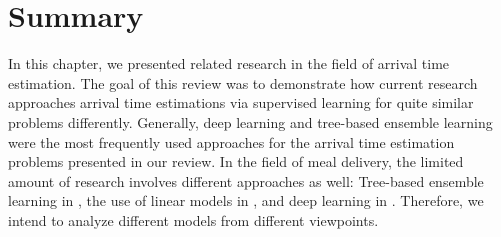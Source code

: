\section{Summary}

In this chapter, we presented related research in the field of arrival time estimation. The goal of this review was to demonstrate how current research approaches arrival time estimations via supervised learning for quite similar problems differently. Generally, deep learning and tree-based ensemble learning were the most frequently used approaches for the arrival time estimation problems presented in our review. In the field of meal delivery, the limited amount of research involves different approaches as well: Tree-based ensemble learning in \cite{Hildebrandt2020_EAT}, the use of linear models in \cite{Liu2018_LM_PLM}, and deep learning in \cite{Zhu2020_OFCTE_DL}. Therefore, we intend to analyze different models from different viewpoints. 